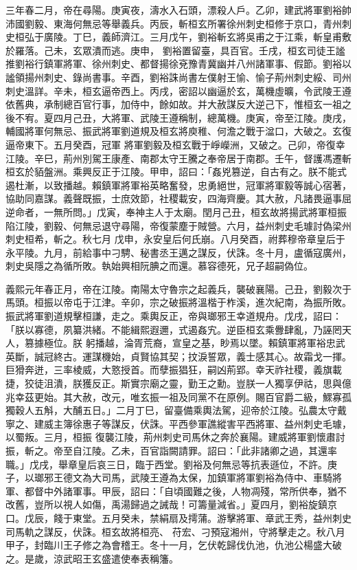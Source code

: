 \begin{pinyinscope}
 三年春二月，帝在尋陽。庚寅夜，濤水入石頭，漂殺人戶。乙卯，建武將軍劉裕帥沛國劉毅、東海何無忌等舉義兵。丙辰，斬桓玄所署徐州刺史桓修于京口，青州刺史桓弘于廣陵。丁巳，義師濟江。三月戊午，劉裕斬玄將吳甫之于江乘，斬皇甫敷於羅落。己未，玄眾潰而逃。庚申，
 劉裕置留臺，具百官。壬戌，桓玄司徒王謐推劉裕行鎮軍將軍、徐州刺史、都督揚徐兗豫青冀幽并八州諸軍事、假節。劉裕以謐領揚州刺史、錄尚書事。辛酉，劉裕誅尚書左僕射王愉、愉子荊州刺史綏、司州刺史溫詳。辛未，桓玄逼帝西上。丙戌，密詔以幽逼於玄，萬機虛曠，令武陵王遵依舊典，承制總百官行事，加侍中，餘如故。并大赦謀反大逆己下，惟桓玄一祖之後不宥。夏四月己丑，大將軍、武陵王遵稱制，總萬機。庚寅，帝至江陵。庚戌，輔國將軍何無忌、振武將軍劉道規及桓玄將庾稚、何澹之戰于湓口，大破之。玄復逼帝東下。五月癸酉，冠軍
 將軍劉毅及桓玄戰于崢嶸洲，又破之。己卯，帝復幸江陵。辛巳，荊州別駕王康產、南郡太守王騰之奉帝居于南郡。壬午，督護馮遷斬桓玄於貊盤洲。乘興反正于江陵。甲申，詔曰：「姦兇篡逆，自古有之。朕不能式遏杜漸，以致播越。賴鎮軍將軍裕英略奮發，忠勇絕世，冠軍將軍毅等誠心宿著，協助同嘉謀。義聲既振，士庶效節，社稷載安，四海齊慶。其大赦，凡諸畏逼事屈逆命者，一無所問。」戊寅，奉神主人于太廟。閏月己丑，桓玄故將揚武將軍桓振陷江陵，劉毅、何無忌退守尋陽，帝復蒙塵于賊營。六月，益州刺史毛璩討偽梁州刺史桓希，斬之。秋七月
 戊申，永安皇后何氏崩。八月癸酉，祔葬穆帝章皇后于永平陵。九月，前給事中刁騁、秘書丞王邁之謀反，伏誅。冬十月，盧循寇廣州，刺史吳隱之為循所敗。執始興相阮腆之而還。慕容德死，兄子超嗣偽位。



 義熙元年春正月，帝在江陵。南陽太守魯宗之起義兵，襲破襄陽。己丑，劉毅次于馬頭。桓振以帝屯于江津。辛卯，宗之破振將溫楷于柞溪，進次紀南，為振所敗。振武將軍劉道規擊桓謙，走之。乘輿反正，帝與瑯邪王幸道規舟。戊戌，詔曰：「朕以寡德，夙纂洪緒。不能緝熙遐邇，式遏姦宄。逆臣桓玄乘釁肆亂，乃誣罔天人，篡據極位。朕
 躬播越，淪胥荒裔，宣皇之基，眇焉以墜。賴鎮軍將軍裕忠武英斷，誠冠終古。運謀機始，貞賢協其契；抆淚誓眾，義士感其心。故霜戈一揮。巨猾奔迸，三率棱威，大憝授首。而孽振猖狂，嗣凶荊郢。幸天祚社稷，義旗載捷，狡徒沮潰，朕獲反正。斯實宗廟之靈，勤王之勳。豈朕一人獨享伊祜，思與億兆幸茲更始。其大赦，改元，唯玄振一祖及同黨不在原例。賜百官爵二級，鰥寡孤獨穀人五斛，大酺五日。」二月丁巳，留臺備乘輿法駕，迎帝於江陵。弘農太守戴寧之、建威主簿徐惠子等謀反，伏誅。平西參軍譙縱害平西將軍、益州刺史毛璩，以蜀叛。三月，桓振
 復襲江陵，荊州刺史司馬休之奔於襄陽。建威將軍劉懷肅討振，斬之。帝至自江陵。乙未，百官詣闕請罪。詔曰：「此非諸卿之過，其還率職。」戊戌，舉章皇后哀三日，臨于西堂。劉裕及何無忌等抗表遜位，不許。庚子，以瑯邪王德文為大司馬，武陵王遵為太保，加鎮軍將軍劉裕為侍中、車騎將軍、都督中外諸軍事。甲辰，詔曰：「自頃國難之後，人物凋殘，常所供奉，猶不改舊，豈所以視人如傷，禹湯歸過之誡哉！可籌量減省。」夏四月，劉裕旋鎮京口。戊辰，餞于東堂。五月癸未，禁絹扇及摴蒲。游擊將軍、章武王秀，益州刺史司馬軌之謀反，伏誅。桓玄故將桓亮、
 苻宏、刁預寇湘州，守將擊走之。秋八月甲子，封臨川王子修之為會稽王。冬十一月，乞伏乾歸伐仇池，仇池公楊盛大破之。是歲，涼武昭王玄盛遣使奉表稱籓。




\end{pinyinscope}
